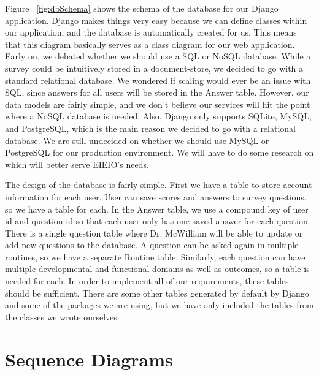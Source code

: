 Figure ~\ref{fig:dbSchema} shows the schema of the database for our Django application. Django makes things very easy because we can define classes within our application, and the database is automatically created for us. This means that this diagram basically serves as a class diagram for our web application. Early on, we debated whether we should use a SQL or NoSQL database. While a survey could be intuitively stored in a document-store, we decided to go with a standard relational database. We wondered if scaling would ever be an issue with SQL, since answers for all users will be stored in the Answer table. However, our data models are fairly simple, and we don't believe our services will hit the point where a NoSQL database is needed. Also, Django only supports SQLite, MySQL, and PostgreSQL, which is the main reason we decided to go with a relational database. We are still undecided on whether we should use MySQL or PostgreSQL for our production environment. We will have to do some research on which will better serve EIEIO's needs.

The design of the database is fairly simple. First we have a table to store account information for each user. User can save scores and answers to survey questions, so we have a table for each. In the Answer table, we use a compound key of user id and question id so that each user only has one saved answer for each question. There is a single question table where Dr. McWilliam will be able to update or add new questions to the database. A question can be asked again in multiple routines, so we have a separate Routine table. Similarly, each question can have multiple developmental and functional domains as well as outcomes, so a table is needed for each. In order to implement all of our requirements, these tables should be sufficient. There are some other tables generated by default by Django and some of the packages we are using, but we have only included the tables from the classes we wrote ourselves.

\section{Sequence Diagrams}

